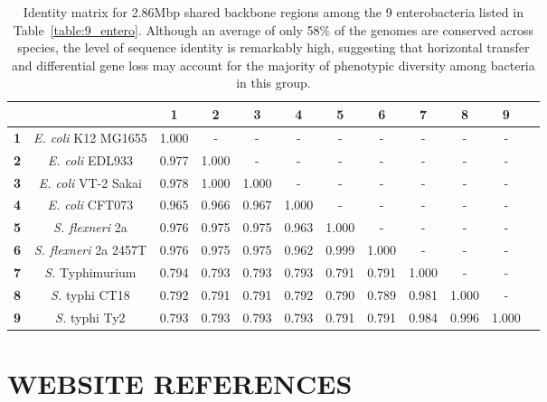 \documentclass[titlepage,11pt]{article}
\begin{document}
\begin{table}
\begin{tabular}{|c|c|c|c|c|c|c|c|c|c|c|l|} \hline
&& \textbf{1} & \textbf{2} & \textbf{3} & \textbf{4} & \textbf{5} & \textbf{6} &
\textbf{7} & \textbf{8} & \textbf{9} \\ \hline
\textbf{1} & \textit{E. coli} K12 MG1655 & 1.000 & - & - & - & - & - & - & - & - \\ 
\hline
\textbf{2} & \textit{E. coli} EDL933 & 0.977 & 1.000 & - & - & - & - & - & - & - \\ 
\hline
\textbf{3} & \textit{E. coli} VT-2 Sakai & 0.978 & 1.000 & 1.000 & - & - & - & - & - & - \\ 
\hline
\textbf{4} & \textit{E. coli} CFT073 & 0.965 & 0.966 & 0.967 & 1.000 & - & - & - & - & - \\ 
\hline
\textbf{5} & \textit{S. flexneri} 2a & 0.976 & 0.975 & 0.975 & 0.963 & 1.000 & - & - & - & - \\ 
\hline
\textbf{6} & \textit{S. flexneri} 2a 2457T & 0.976 & 0.975 & 0.975 & 0.962 & 0.999 & 1.000 & - & - & - \\ 
\hline
\textbf{7} & \textit{S.} Typhimurium & 0.794 & 0.793 & 0.793 & 0.793 & 0.791 & 0.791 & 1.000 & - & - \\ 
\hline
\textbf{8} & \textit{S.} typhi CT18 & 0.792 & 0.791 & 0.791 & 0.792 & 0.790 & 0.789 & 0.981 & 1.000 & - \\ 
\hline
\textbf{9} & \textit{S.} typhi Ty2 & 0.793 & 0.793 & 0.793 & 0.793 & 0.791 & 0.791 & 0.984 & 0.996 & 1.000 \\ 
\hline
\hline\end{tabular}
\caption{\label{table:entero_identity} Identity matrix 
for 2.86Mbp shared backbone regions among the 9 enterobacteria listed in 
Table~\ref{table:9_entero}.  Although an average of only 58\% of the genomes are
conserved across species, the level of sequence identity is remarkably high,
suggesting that horizontal transfer and differential gene loss may account for
the majority of phenotypic diversity among bacteria in this group.}  
\end{table}

\section*{}
\selectfont

%
%


\section*{ WEBSITE REFERENCES }
\end{document}
